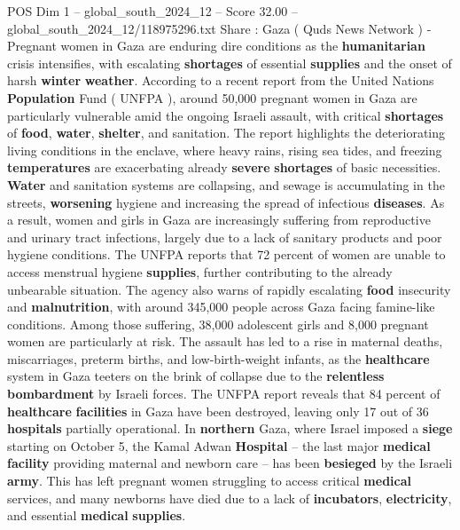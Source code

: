 \begin{textsample}{POS Dim 1 – global\_south\_2024\_12 – Score 32.00 – global\_south\_2024\_12/118975296.txt}  \label{ex:f1_pos_105}
Share : Gaza ( Quds News Network ) - Pregnant women in Gaza are enduring dire conditions as the \textbf{humanitarian} crisis intensifies, with escalating \textbf{shortages} of essential \textbf{supplies} and the onset of harsh \textbf{winter} \textbf{weather}.
According to a recent report from the United Nations \textbf{Population} Fund ( UNFPA ), around 50,000 pregnant women in Gaza are particularly vulnerable amid the ongoing Israeli assault, with critical \textbf{shortages} of \textbf{food}, \textbf{water}, \textbf{shelter}, and sanitation.
The report highlights the deteriorating living conditions in the enclave, where heavy rains, rising sea tides, and freezing \textbf{temperatures} are exacerbating already \textbf{severe} \textbf{shortages} of basic necessities. \textbf{Water} and sanitation systems are collapsing, and sewage is accumulating in the streets, \textbf{worsening} hygiene and increasing the spread of infectious \textbf{diseases}.
As a result, women and girls in Gaza are increasingly suffering from reproductive and urinary tract infections, largely due to a lack of sanitary products and poor hygiene conditions.
The UNFPA reports that 72 percent of women are unable to access menstrual hygiene \textbf{supplies}, further contributing to the already unbearable situation.
The agency also warns of rapidly escalating \textbf{food} insecurity and \textbf{malnutrition}, with around 345,000 people across Gaza facing famine-like conditions.
Among those suffering, 38,000 adolescent girls and 8,000 pregnant women are particularly at risk.
The assault has led to a rise in maternal deaths, miscarriages, preterm births, and low-birth-weight infants, as the \textbf{healthcare} system in Gaza teeters on the brink of collapse due to the \textbf{relentless} \textbf{bombardment} by Israeli forces.
The UNFPA report reveals that 84 percent of \textbf{healthcare} \textbf{facilities} in Gaza have been destroyed, leaving only 17 out of 36 \textbf{hospitals} partially operational.
In \textbf{northern} Gaza, where Israel imposed a \textbf{siege} starting on October 5, the Kamal Adwan \textbf{Hospital} -- the last major \textbf{medical} \textbf{facility} providing maternal and newborn care -- has been \textbf{besieged} by the Israeli \textbf{army}.
This has left pregnant women struggling to access critical \textbf{medical} services, and many newborns have died due to a lack of \textbf{incubators}, \textbf{electricity}, and essential \textbf{medical} \textbf{supplies}.

\end{textsample}
